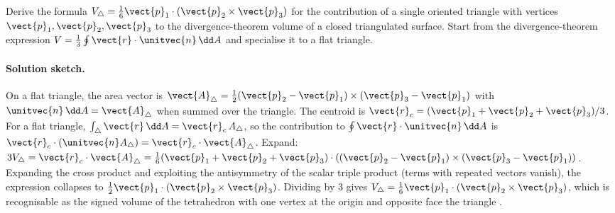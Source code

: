 \begin{exercise}
Derive the formula $V_{\triangle} = \tfrac{1}{6}\vect{p}_{1} \cdot
(\vect{p}_{2} \times \vect{p}_{3})$ for the contribution of a single
oriented triangle with vertices $\vect{p}_{1}, \vect{p}_{2},
\vect{p}_{3}$ to the divergence-theorem volume of a closed
triangulated surface. Start from the divergence-theorem expression
$V = \tfrac{1}{3} \oint \vect{r} \cdot \unitvec{n} \,\dd A$ and
specialise it to a flat triangle.

\paragraph{Solution sketch.} On a flat triangle, the area vector is
$\vect{A}_{\triangle} = \tfrac{1}{2}(\vect{p}_{2} - \vect{p}_{1})
\times(\vect{p}_{3} - \vect{p}_{1})$ with $\unitvec{n}\,\dd A =
\vect{A}_{\triangle}$ when summed over the triangle. The centroid
is $\vect{r}_{c} = (\vect{p}_{1} + \vect{p}_{2} + \vect{p}_{3})/3$.
For a flat triangle, $\int_{\triangle}\vect{r}\,\dd A = \vect{r}_{c}
\,A_{\triangle}$, so the contribution to $\oint\vect{r}\cdot
\unitvec{n}\,\dd A$ is $\vect{r}_{c}\cdot(\unitvec{n} A_{\triangle})
= \vect{r}_{c}\cdot\vect{A}_{\triangle}$. Expand:
$3 V_{\triangle} = \vect{r}_{c}\cdot\vect{A}_{\triangle} =
\tfrac{1}{6}(\vect{p}_{1} + \vect{p}_{2} + \vect{p}_{3})\cdot
((\vect{p}_{2} - \vect{p}_{1})\times(\vect{p}_{3} - \vect{p}_{1}))$.
Expanding the cross product and exploiting the antisymmetry of the
scalar triple product (terms with repeated vectors vanish), the
expression collapses to $\tfrac{1}{2}\vect{p}_{1}\cdot
(\vect{p}_{2}\times\vect{p}_{3})$. Dividing by 3 gives $V_{\triangle}
= \tfrac{1}{6}\vect{p}_{1}\cdot(\vect{p}_{2}\times\vect{p}_{3})$,
which is recognisable as the signed volume of the tetrahedron with
one vertex at the origin and opposite face the triangle
\cite{paper:v2ch08-zhang-chen-2001}.
\end{exercise}

